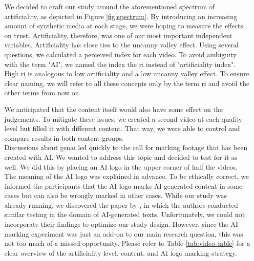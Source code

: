 \documentclass[
  a4paper,  %
  twoside,  %
  bibliography=totoc,
  headsepline,
  cleardoublepage=empty,
  parskip=half,
  draft=false
]{scrbook}
\begin{document}
We decided to craft our study around the aforementioned spectrum of artificiality, as depicted in Figure \ref{fig:spectrum}. By introducing an increasing amount of synthetic media at each stage, we were hoping to measure the effects on trust. Artificiality, therefore, was one of our most important independent variables. Artificiality has close ties to the uncanny valley effect. Using several questions, we calculated a perceived index for each video. To avoid ambiguity with the term "AI", we named the index the \gls{ri} instead of "artificiality index". High \gls{ri} is analogous to low artificiality and a low uncanny valley effect. To ensure clear naming, we will refer to all these concepts only by the term \gls{ri} and avoid the other terms from now on.

We anticipated that the content itself would also have some effect on the judgements. To mitigate these issues, we created a second video at each quality level but filled it with different content. That way, we were able to control and compare results in both content groups. \\
Discussions about \gls{genai} led quickly to the call for marking footage that has been created with AI. We wanted to address this topic and decided to test for it as well. We did this by placing an AI logo in the upper corner of half the videos. The meaning of the AI logo was explained in advance. To be ethically correct, we informed the participants that the AI logo marks AI-generated content in some cases but can also be wrongly marked in other cases. While our study was already running, we discovered the paper by \citeauthor{toffTheyCouldJust2023}, in which the authors conducted similar testing in the domain of AI-generated texts. Unfortunately, we could not incorporate their findings to optimize our study design. However, since the AI marking experiment was just an add-on to our main research question, this was not too much of a missed opportunity. Please refer to Table \ref{tab:video-table} for a clear overview of the artificiality level, content, and AI logo marking strategy.
\end{document}
